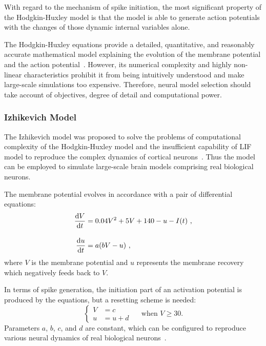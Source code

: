 With regard to the mechanism of spike initiation, the most significant property of the Hodgkin-Huxley model is that the model is able to generate action potentials with the changes of those dynamic internal variables alone.

The Hodgkin-Huxley equations provide a detailed, quantitative, and reasonably accurate mathematical model explaining the evolution of the membrane potential and the action potential~\citep{byrne2014molecules}.
However, its numerical complexity and highly non-linear characteristics prohibit it from being intuitively understood and make large-scale simulations too expensive.
Therefore, neural model selection should take account of objectives, degree of detail and computational power.

\subsubsection{Izhikevich Model}
The Izhikevich model was proposed to solve the problems of computational complexity of the Hodgkin-Huxley model and the insufficient capability of LIF model to reproduce the complex dynamics of cortical neurons~\citep{izhikevich2003simple}.
Thus the model can be employed to simulate large-scale brain models comprising real biological neurons.

The membrane potential evolves in accordance with a pair of differential equations:
\begin{equation}
\begin{aligned}
\dfrac{\mathrm{d} V}{\mathrm{d} t} &= 0.04V^2 + 5V + 140 - u - I(t)~,\\[10pt]
\dfrac{\mathrm{d} u}{\mathrm{d} t} &= a(bV - u)~,
\end{aligned}
\end{equation}
where $V$ is the membrane potential and $u$ represents the membrane recovery which negatively feeds back to $V$.

In terms of spike generation, the initiation part of an activation potential is produced by the equations, but a resetting scheme is needed:
\begin{equation}
\left\{
\begin{aligned}
V &= c \\
u &= u + d
\end{aligned}
\right.
\textrm{~~~~when~} V \geq 30.
\end{equation}  
Parameters $a$, $b$, $c$, and $d$ are constant, which can be configured to reproduce various neural dynamics of real biological neurons~\citep{izhikevich2004model}.

